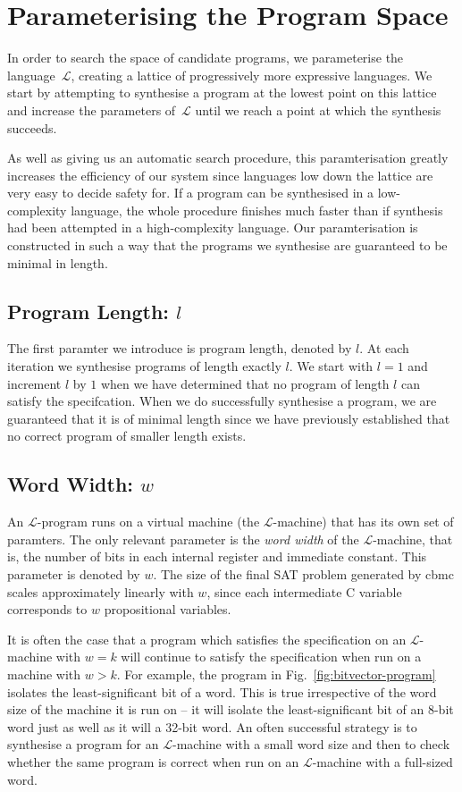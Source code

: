 \documentclass[a4paper]{llncs}
\begin{document}
\section{Parameterising the Program Space}
In order to search the space of candidate programs, we parameterise
the language~$\mathcal{L}$, creating a lattice of progressively
more expressive languages.  We start by attempting to synthesise
a program at the lowest point on this lattice and increase the
parameters of~$\mathcal{L}$ until we reach a point at which
the synthesis succeeds.

As well as giving us an automatic search procedure, this paramterisation
greatly increases the efficiency of our system since languages
low down the lattice are very easy to decide safety for.  If a program
can be synthesised in a low-complexity language, the whole procedure
finishes much faster than if synthesis had been attempted in a
high-complexity language.  Our paramterisation is constructed
in such a way that the programs we synthesise are guaranteed to be
minimal in length.

\subsection{Program Length: $l$}
The first paramter we introduce is program length, denoted by $l$.
At each iteration we synthesise programs of length exactly $l$.
We start with $l = 1$ and increment $l$ by $1$ when we have determined
that no program of length $l$ can satisfy the specifcation.  When we do
successfully synthesise a program, we are guaranteed that it
is of minimal length since we have previously established that no
correct program of smaller length exists.


\subsection{Word Width: $w$}
An $\mathcal{L}$-program runs on a virtual machine (the $\mathcal{L}$-machine) that
has its own set of paramters.  The only relevant parameter is
the \emph{word width} of the $\mathcal{L}$-machine, that is, the number of bits
in each internal register and immediate constant.  This parameter is denoted by
$w$.  The size of the final SAT problem generated by {\sc cbmc} scales
approximately linearly with $w$, since each intermediate C variable corresponds
to $w$ propositional variables.

It is often the case that a program which satisfies the specification
on an $\mathcal{L}$-machine with $w = k$ will continue to satisfy the
specification when run on a machine with $w > k$.  For example, the program
in Fig.~\ref{fig:bitvector-program} isolates the least-significant bit of a word.
This is true irrespective of the word size of the machine it is run on -- it will
isolate the least-significant bit of an 8-bit word just as well as it will a
32-bit word.  An often successful strategy is to synthesise a program for an
$\mathcal{L}$-machine with a small word size and then to check whether the
same program is correct when run on an $\mathcal{L}$-machine with a
full-sized word.
\end{document}

